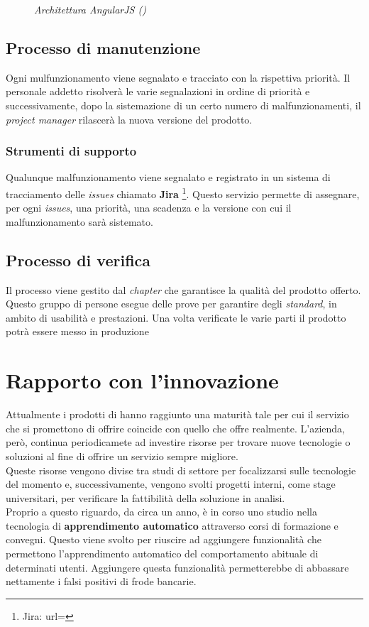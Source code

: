\begin{itemize}
\begin{figure}[ht]
	\caption{\textit{Architettura AngularJS ()}}
\end{figure}
\end{itemize}

\subsection{Processo di manutenzione}
Ogni mulfunzionamento viene segnalato e tracciato con la rispettiva priorità. Il personale addetto risolverà le varie segnalazioni in ordine di priorità e successivamente, dopo la sistemazione di un certo numero di malfunzionamenti, il \textit{project manager} rilascerà la nuova versione del prodotto.
\subsubsection{Strumenti di supporto}
Qualunque malfunzionamento viene segnalato e registrato in un sistema di tracciamento delle \textit{issues} chiamato \textbf{Jira} \footnote{Jira: url= }. Questo servizio permette di assegnare, per ogni \textit{issues}, una priorità, una scadenza e la versione con cui il malfunzionamento sarà sistemato. 
\subsection{Processo di verifica}
Il processo viene gestito dal \textit{chapter} che garantisce la qualità del prodotto offerto. Questo gruppo di persone esegue delle prove per garantire degli \textit{standard}, in ambito di usabilità e prestazioni. Una volta verificate le varie parti il prodotto potrà essere messo in produzione






\section{Rapporto con l'innovazione}
Attualmente i prodotti di \textit{\azienda} hanno raggiunto una maturità tale per cui il servizio che si promettono di offrire coincide con quello che offre realmente. L'azienda, però, continua periodicamete ad investire risorse per trovare nuove tecnologie o soluzioni al fine di offrire un servizio sempre migliore.\\
Queste risorse vengono divise tra studi di settore per focalizzarsi sulle tecnologie del momento e, successivamente, vengono svolti progetti interni, come stage universitari, per verificare la fattibilità della soluzione in analisi. \\
Proprio a questo riguardo, da circa un anno, è in corso uno studio nella tecnologia di \textbf{apprendimento automatico} attraverso corsi di formazione e convegni. Questo viene svolto per riuscire ad aggiungere funzionalità che permettono l'apprendimento automatico del comportamento abituale di determinati utenti. Aggiungere questa funzionalità permetterebbe di abbassare nettamente i falsi positivi di frode bancarie.


